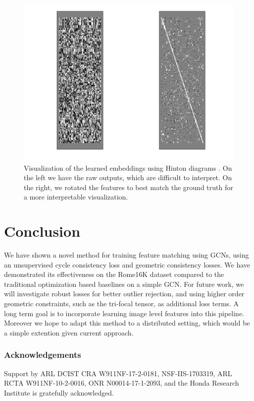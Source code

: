 \documentclass[10pt,twocolumn,letterpaper]{article}
\begin{document}
\begin{figure}[t]
\begin{center}
  \includegraphics[width=0.8\linewidth]{figures-EmbeddingsViz.png}
  \end{center}
     \caption{
         Visualization of the learned embeddings using Hinton diagrams \cite{bremner1994hinton}.
         On the left we have the raw outputs, which are difficult to interpret.
         On the right, we rotated the features to best match the ground truth for a more interpretable visualization.
     }
  \label{fig:onecol}
  \label{fig:embeddingsviz}
\end{figure}
\section{Conclusion}

We have shown a novel method for training feature matching using GCNs, using an unsupervised cycle consistency loss and geometric consistency losses.
We have demonstrated its effectiveness on the Rome16K dataset compared to the traditional optimization based baselines on a simple GCN.
For future work, we will investigate robust losses for better outlier rejection, and using higher order geometric constraints, such as the tri-focal tensor, as additional loss terms.
A long term goal is to incorporate learning image level features into this pipeline.
Moreover we hope to adapt this method to a distributed setting, which would be a simple extention given current approach.

\subsubsection*{Acknowledgements}
Support by ARL DCIST CRA W911NF-17-2-0181, NSF-IIS-1703319, ARL RCTA W911NF-10-2-0016, ONR N00014-17-1-2093, and the Honda Research Institute is gratefully acknowledged.
\end{document}
